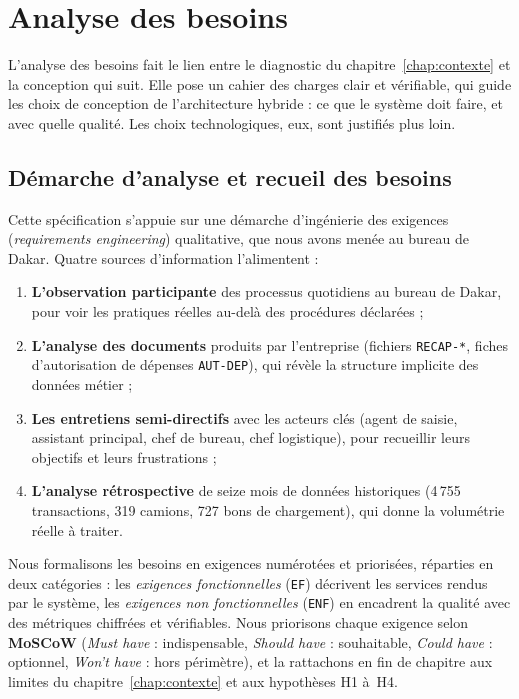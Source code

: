 \section{Analyse des besoins}
\label{chap:besoins}
L'analyse des besoins fait le lien entre le diagnostic du chapitre~\ref{chap:contexte} et la conception qui suit. Elle pose un cahier des charges clair et vérifiable, qui guide les choix de conception de l'architecture hybride : ce que le système doit faire, et avec quelle qualité. Les choix technologiques, eux, sont justifiés plus loin.

\subsection{Démarche d'analyse et recueil des besoins}
\label{sec:recueil}
Cette spécification s'appuie sur une démarche d'ingénierie des exigences (\textit{requirements engineering}) qualitative, que nous avons menée au bureau de Dakar. Quatre sources d'information l'alimentent :

\begin{enumerate}
    \item \textbf{L'observation participante} des processus quotidiens au bureau de Dakar, pour voir les pratiques réelles au-delà des procédures déclarées ;
    \item \textbf{L'analyse des documents} produits par l'entreprise (fichiers \texttt{RECAP-*}, fiches d'autorisation de dépenses \texttt{AUT-DEP}), qui révèle la structure implicite des données métier ;
    \item \textbf{Les entretiens semi-directifs} avec les acteurs clés (agent de saisie, assistant principal, chef de bureau, chef logistique), pour recueillir leurs objectifs et leurs frustrations ;
    \item \textbf{L'analyse rétrospective} de seize mois de données historiques (4\,755 transactions, 319 camions, 727 bons de chargement), qui donne la volumétrie réelle à traiter.
\end{enumerate}

Nous formalisons les besoins en exigences numérotées et priorisées, réparties en deux catégories : les \emph{exigences fonctionnelles} (\texttt{EF}) décrivent les services rendus par le système, les \emph{exigences non fonctionnelles} (\texttt{ENF}) en encadrent la qualité avec des métriques chiffrées et vérifiables. Nous priorisons chaque exigence selon \textbf{MoSCoW} (\textit{Must have} : indispensable, \textit{Should have} : souhaitable, \textit{Could have} : optionnel, \textit{Won't have} : hors périmètre), et la rattachons en fin de chapitre aux limites du chapitre~\ref{chap:contexte} et aux hypothèses H1 à~H4.

